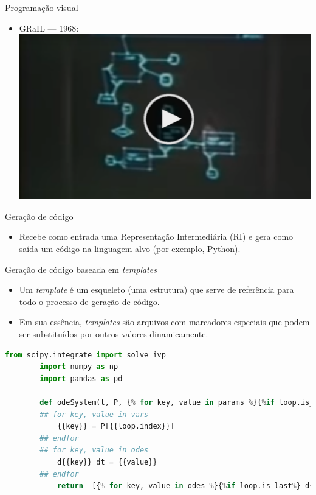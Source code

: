 \begin{frame}{Programação visual} 
    \begin{itemize}
        \item GRaIL — 1968:
        \href{https://www.youtube.com/watch?v=QQhVQ1UG6aM}{
            \includegraphics[width=\textwidth, height=\textheight, keepaspectratio=true]{beamerthemesrc/images/video-thumb.png}
        }
    \end{itemize}     
\end{frame}

\begin{frame}{Geração de código}
    \begin{itemize}
        \item Recebe como entrada uma Representação Intermediária (RI) e gera como saída um código na linguagem alvo (por exemplo, Python).
    \end{itemize}    
\end{frame}

\begin{frame}{Geração de código baseada em \textit{templates}}
    \begin{itemize}
        \item Um \textit{template} é um esqueleto (uma estrutura) que serve de referência para todo o processo de geração de código.
        \item Em sua essência, \textit{templates} são arquivos com marcadores especiais que podem ser substituídos por outros valores dinamicamente.         
    \end{itemize}    
    \begin{lstlisting}[language=Python, firstnumber=1]
        from scipy.integrate import solve_ivp
        import numpy as np
        import pandas as pd
        
        def odeSystem(t, P, {% for key, value in params %}{%if loop.is_last%} {{key}} {%else%} {{key}}, {%endif%}{%endfor%}):
        ## for key, value in vars
            {{key}} = P[{{loop.index}}]
        ## endfor
        ## for key, value in odes
            d{{key}}_dt = {{value}}
        ## endfor     
            return  [{% for key, value in odes %}{%if loop.is_last%} d{{key}}_dt {%else%} d{{key}}_dt, {%endif%}{%endfor%}]
    \end{lstlisting}
\end{frame}


